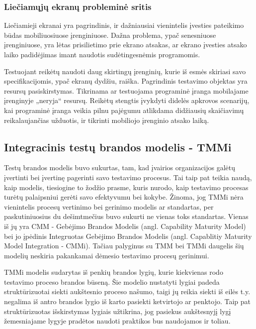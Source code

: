 \documentclass{VUMIFPSkursinis}
\begin{document}
\subsubsection{Liečiamųjų ekranų probleminė sritis}
Liečiamieji ekranai yra pagrindinis, ir dažniausiai vienintelis įvesties pateikimo būdas mobiliuosiuose įrenginiuose. Dažna problema, ypač senesniuose įrenginiuose, yra lėtas prisilietimo prie ekrano atsakas, ar ekrano įvesties atsako laiko padidėjimas imant naudotis sudėtingesnėmis programomis.

Testuojant reikėtų naudoti daug skirtingų įrenginių, kurie iš esmės skiriasi savo specifikacijomis, ypač ekranų dydžiu, raiška. Pagrindinis testavimo objektas yra resursų pasiskirstymas. Tikrinama ar testuojama programinė įranga mobilajame įrenginyje „neryja“ resursų. Reikėtų stengtis įvykdyti didelės apkrovos scenarijų, kai programinė įranga veikia pilnu pajėgumu atlikdama didžiausių skaičiavimų reikalaujančias užduotis, ir tikrinti mobiliojo įrenginio atsako laiką.

\subsection{Integracinis testų brandos modelis - TMMi}
Testų brandos modelis buvo sukurtas, tam, kad įvairios organizacijos galėtų įvertinti bei įvertinę pagerinti savo testavimo procesus. Tai taip pat teikia naudą, kaip modelis, tiesiogine to žodžio prasme, kuris nurodo, kaip testavimo procesas turėtų  palaipsniui gerėti savo efektyvumu bei kokybe. \cite{Burnstein:2010:PST:1965566} Žinoma, jog TMMi nėra vienintelis procesų vertinimo bei gerinimo modelis ar standartas, per paskutiniuosius du dešimtmečius buvo sukurti ne vienas toks standartas. Vienas iš jų yra CMM - Gebėjimo Brandos Modelis (angl. Capability Maturity Model) bei jo įpėdinis Integruotas Gebėjimo Brandos Modelis (angl. Capablitiy Maturity Model Integration - CMMi). Tačiau palyginus su TMM bei TMMi daugelis šių modelių neskiria pakankamai dėmesio testavimo procesų gerinimui. 

TMMi modelis sudarytas iš penkių brandos lygių, kurie kiekvienas rodo testavimo proceso brandos būseną. Šie modelio nustatyti lygiai padeda struktūrizuotai siekti aukštesnio proceso našumo, taigi jų reikia siekti iš eilės t.y. negalima iš antro brandos lygio iš karto pasiekti ketvirtojo ar penktojo. Taip pat struktūrizuotas išskirstymas lygiais užtikrina, jog pasiekus aukštesnyjį lygį žemesniajame lygyje pradėtos naudoti praktikos bus naudojamos ir toliau.
\end{document}
